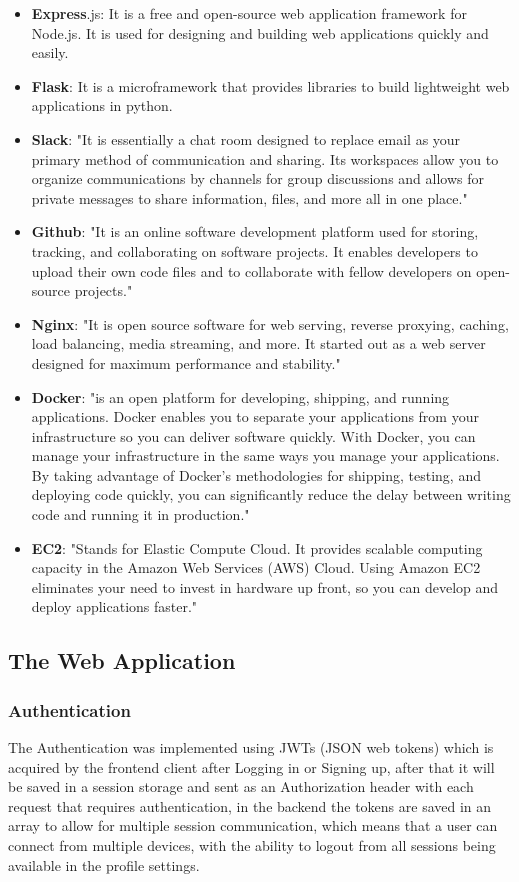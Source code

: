\begin{itemize}
        \item \textbf{Express}.js: It  is a free and open-source web application framework for Node.js. It is used for designing and building web applications quickly and easily. ~\cite{32}
        \item \textbf{Flask}: It is a microframework that provides libraries to build lightweight web applications in python. ~\cite{33}
        \item \textbf{Slack}: "It is essentially a chat room designed to replace email as your primary method of communication and sharing. Its workspaces allow you to organize communications by channels for group discussions and allows for private messages to share information, files, and more all in one place." ~\cite{34}
        \item \textbf{Github}: "It is an online software development platform used for storing, tracking, and collaborating on software projects. It enables developers to upload their own code files and to collaborate with fellow developers on open-source projects." ~\cite{35}
        \item \textbf{Nginx}: "It is open source software for web serving, reverse proxying, caching, load balancing, media streaming, and more. It started out as a web server designed for maximum performance and stability." ~\cite{36}
        \item \textbf{Docker}: "is an open platform for developing, shipping, and running applications. Docker enables you to separate your applications from your infrastructure so you can deliver software quickly. With Docker, you can manage your infrastructure in the same ways you manage your applications. By taking advantage of Docker’s methodologies for shipping, testing, and deploying code quickly, you can significantly reduce the delay between writing code and running it in production." ~\cite{37}
        \item \textbf{EC2}: "Stands for Elastic Compute Cloud. It provides scalable computing capacity in the Amazon Web Services (AWS) Cloud. Using Amazon EC2 eliminates your need to invest in hardware up front, so you can develop and deploy applications faster." ~\cite{38}
    \end{itemize}
    \normalsize
\subsection{The Web Application}
    \subsubsection{Authentication}
        The Authentication was implemented using JWTs (JSON web tokens) which is acquired by the frontend client after Logging in or Signing up, after that it will be saved in a session storage and sent as an Authorization header with each request that requires authentication, in the backend the tokens are saved in an array to allow for multiple session communication, which means that a user can connect from multiple devices, with the ability to logout from all sessions being available in the profile settings.
    

